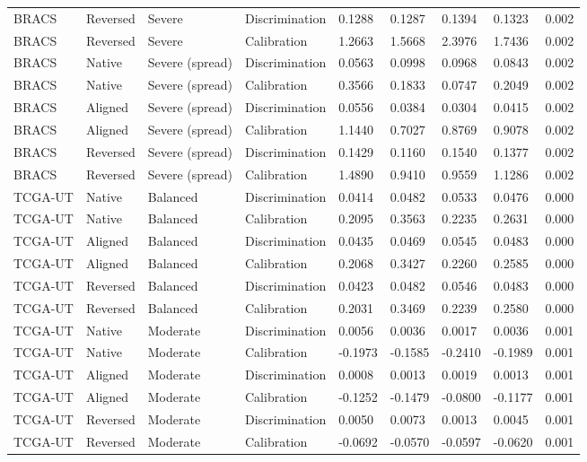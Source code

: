 \begin{longtable}{lllllllll}
BRACS & Reversed & Severe & Discrimination & 0.1288 & 0.1287 & 0.1394 & 0.1323 & 0.002 \\
BRACS & Reversed & Severe & Calibration & 1.2663 & 1.5668 & 2.3976 & 1.7436 & 0.002 \\
BRACS & Native & Severe (spread) & Discrimination & 0.0563 & 0.0998 & 0.0968 & 0.0843 & 0.002 \\
BRACS & Native & Severe (spread) & Calibration & 0.3566 & 0.1833 & 0.0747 & 0.2049 & 0.002 \\
BRACS & Aligned & Severe (spread) & Discrimination & 0.0556 & 0.0384 & 0.0304 & 0.0415 & 0.002 \\
BRACS & Aligned & Severe (spread) & Calibration & 1.1440 & 0.7027 & 0.8769 & 0.9078 & 0.002 \\
BRACS & Reversed & Severe (spread) & Discrimination & 0.1429 & 0.1160 & 0.1540 & 0.1377 & 0.002 \\
BRACS & Reversed & Severe (spread) & Calibration & 1.4890 & 0.9410 & 0.9559 & 1.1286 & 0.002 \\
TCGA-UT & Native & Balanced & Discrimination & 0.0414 & 0.0482 & 0.0533 & 0.0476 & 0.000 \\
TCGA-UT & Native & Balanced & Calibration & 0.2095 & 0.3563 & 0.2235 & 0.2631 & 0.000 \\
TCGA-UT & Aligned & Balanced & Discrimination & 0.0435 & 0.0469 & 0.0545 & 0.0483 & 0.000 \\
TCGA-UT & Aligned & Balanced & Calibration & 0.2068 & 0.3427 & 0.2260 & 0.2585 & 0.000 \\
TCGA-UT & Reversed & Balanced & Discrimination & 0.0423 & 0.0482 & 0.0546 & 0.0483 & 0.000 \\
TCGA-UT & Reversed & Balanced & Calibration & 0.2031 & 0.3469 & 0.2239 & 0.2580 & 0.000 \\
TCGA-UT & Native & Moderate & Discrimination & 0.0056 & 0.0036 & 0.0017 & 0.0036 & 0.001 \\
TCGA-UT & Native & Moderate & Calibration & -0.1973 & -0.1585 & -0.2410 & -0.1989 & 0.001 \\
TCGA-UT & Aligned & Moderate & Discrimination & 0.0008 & 0.0013 & 0.0019 & 0.0013 & 0.001 \\
TCGA-UT & Aligned & Moderate & Calibration & -0.1252 & -0.1479 & -0.0800 & -0.1177 & 0.001 \\
TCGA-UT & Reversed & Moderate & Discrimination & 0.0050 & 0.0073 & 0.0013 & 0.0045 & 0.001 \\
TCGA-UT & Reversed & Moderate & Calibration & -0.0692 & -0.0570 & -0.0597 & -0.0620 & 0.001 \\

\end{longtable}
